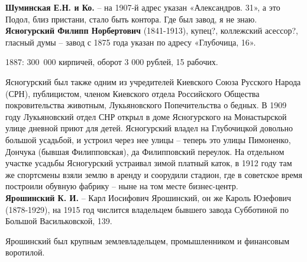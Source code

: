\noindent\textbf{Шуминская Е.Н. и Ко.} – на 1907-й адрес указан «Александров. 31», а это Подол, близ пристани, стало быть контора. Где был завод, я не знаю.\\

\noindent\textbf{Ясногурский Филипп Норбертович} (1841-1913), купец?, коллежский асессор?, гласный думы – завод с 1875 года указан по адресу «Глубочица, 16». 

1887: \mbox{300 000} кирпичей, оборот 3 000 рублей, 15 рабочих.

Ясногурский был также одним из учредителей Киевского Союза Русского Народа (СРН), публицистом, членом Киевского отдела Российского Общества покровительства животным, Лукьяновского Попечительства о бедных. В 1909  году Лукьяновский отдел СНР открыл в доме Ясногурского на Монастырской улице дневной приют для детей. Ясногурский владел на Глубочицкой довольно большой усадьбой, и устроил через нее улицы – теперь это улицы Пимоненко, Дончука (бывшая Филипповская), да Филипповский переулок. На отдельном участке усадьбы Ясногурский устраивал зимой платный каток, в 1912 году там же спортсмены взяли землю в аренду и соорудили стадион, где в советское время построили обувную фабрику – ныне на том месте бизнес-центр.\\

\noindent\textbf{Ярошинский К. И.} – Карл Иосифович Ярошинский, он же Кароль Юзефович (1878-1929), на 1915 год числится владельцем бывшего завода Субботиной по Большой Васильковской, 139. 

Ярошинский был крупным землевладельцем, промышленником и финансовым воротилой.\\